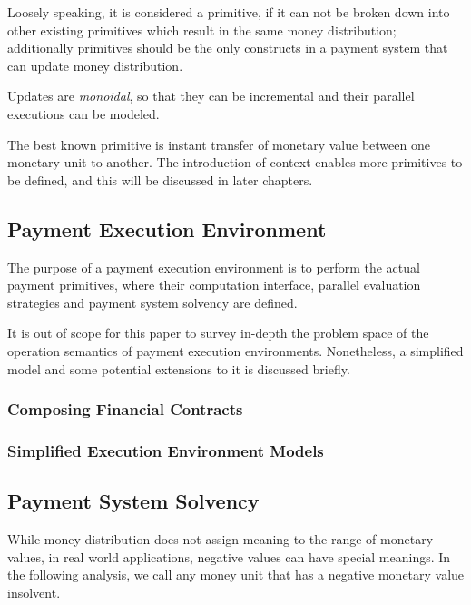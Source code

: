 Loosely speaking, it is considered a primitive, if it can not be broken down into other existing primitives which result
in the same money distribution; additionally primitives should be the only constructs in a payment system that can
update money distribution.

Updates are \textit{monoidal}, so that they can be incremental and their parallel executions can be modeled.

The best known primitive is instant transfer of monetary value between one monetary unit to another. The introduction of
context enables more primitives to be defined, and this will be discussed in later chapters.


\subsection{Payment Execution Environment}

The purpose of a payment execution environment is to perform the actual payment primitives, where their computation
interface, parallel evaluation strategies and payment system solvency are defined.

It is out of scope for this paper to survey in-depth the problem space of the operation semantics of payment execution
environments. Nonetheless, a simplified model and some potential extensions to it is discussed briefly.

\subsubsection{Composing Financial Contracts}



\subsubsection{Simplified Execution Environment Models}




\subsection{Payment System Solvency}

While money distribution does not assign meaning to the range of monetary values, in real world applications, negative
values can have special meanings. In the following analysis, we call any money unit that has a negative monetary value
insolvent.

